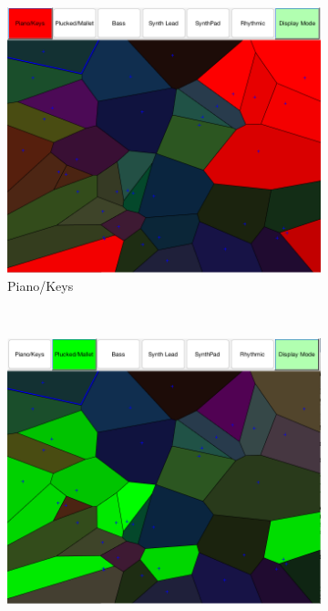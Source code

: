 \documentclass[11pt, oneside]{report}   	%
\begin{document}
\begin{figure}
	\centering
	\begin{subfigure}[b]{0.48\textwidth}
		\includegraphics[width=\textwidth]{CategoryPianoKeys.png}
		\caption{Piano/Keys}
		\label{fig:categoriesPianoKeys}
	\end{subfigure}
	~ %
	\begin{subfigure}[b]{0.48\textwidth}
		\includegraphics[trim={0 0 0.01cm 0}, clip, width=\textwidth]{CategoryPluckedMallet.png}

\end{subfigure}
\end{figure}
\end{document}
